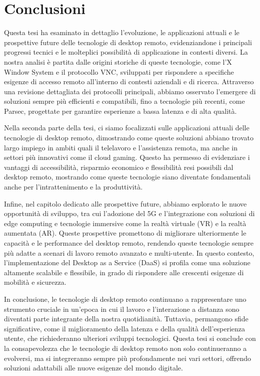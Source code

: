 \documentclass[12pt,a4paper,openright,twoside]{book}
\begin{document}




\chapter{Conclusioni}
\label{chap:conclusioni}

Questa tesi ha esaminato in dettaglio l’evoluzione, le applicazioni attuali e le prospettive future delle tecnologie di desktop remoto, evidenziandone i principali progressi tecnici e le molteplici possibilità di applicazione in contesti diversi. La nostra analisi è partita dalle origini storiche di queste tecnologie, come l’X Window System e il protocollo VNC, sviluppati per rispondere a specifiche esigenze di accesso remoto all'interno di contesti aziendali e di ricerca. Attraverso una revisione dettagliata dei protocolli principali, abbiamo osservato l’emergere di soluzioni sempre più efficienti e compatibili, fino a tecnologie più recenti, come Parsec, progettate per garantire esperienze a bassa latenza e di alta qualità.

Nella seconda parte della tesi, ci siamo focalizzati sulle applicazioni attuali delle tecnologie di desktop remoto, dimostrando come queste soluzioni abbiano trovato largo impiego in ambiti quali il telelavoro e l'assistenza remota, ma anche in settori più innovativi come il cloud gaming. Questo ha permesso di evidenziare i vantaggi di accessibilità, risparmio economico e flessibilità resi possibili dal desktop remoto, mostrando come queste tecnologie siano diventate fondamentali anche per l’intrattenimento e la produttività.

Infine, nel capitolo dedicato alle prospettive future, abbiamo esplorato le nuove opportunità di sviluppo, tra cui l'adozione del 5G e l'integrazione con soluzioni di edge computing e tecnologie immersive come la realtà virtuale (VR) e la realtà aumentata (AR). Queste prospettive promettono di migliorare ulteriormente le capacità e le performance del desktop remoto, rendendo queste tecnologie sempre più adatte a scenari di lavoro remoto avanzato e multi-utente. In questo contesto, l'implementazione del Desktop as a Service (DaaS) si profila come una soluzione altamente scalabile e flessibile, in grado di rispondere alle crescenti esigenze di mobilità e sicurezza.

In conclusione, le tecnologie di desktop remoto continuano a rappresentare uno strumento cruciale in un'epoca in cui il lavoro e l'interazione a distanza sono diventati parte integrante della nostra quotidianità. Tuttavia, permangono sfide significative, come il miglioramento della latenza e della qualità dell’esperienza utente, che richiederanno ulteriori sviluppi tecnologici. Questa tesi si conclude con la consapevolezza che le tecnologie di desktop remoto non solo continueranno a evolversi, ma si integreranno sempre più profondamente nei vari settori, offrendo soluzioni adattabili alle nuove esigenze del mondo digitale.
\end{document}
